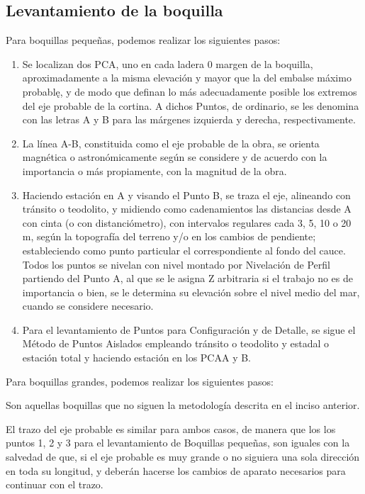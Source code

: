 \subsection{Levantamiento de la boquilla}

Para boquillas pequeñas, podemos realizar los siguientes pasos:

\begin{enumerate}
    \item Se localizan dos PCA, uno en cada ladera 0 margen de la boquilla, aproximadamente a la misma elevación y mayor que la del embalse máximo probablę, y de modo que definan lo más adecuadamente posible los extremos del eje probable de la cortina. A dichos Puntos, de ordinario, se les denomina con las letras A y B para las márgenes izquierda y derecha, respectivamente.
    \item La línea A-B, constituida como el eje probable de la obra, se orienta magnética o astronómicamente según se considere y de acuerdo con la importancia o más propiamente, con la magnitud de la obra.
    \item Haciendo estación en A y visando el Punto B, se traza el eje, alineando con tránsito o teodolito, y midiendo como cadenamientos las distancias desde A con cinta (o con distanciómetro), con intervalos regulares cada 3, 5, 10 o 20 m, según la topografía del terreno y/o en los cambios de pendiente; estableciendo como punto particular el correspondiente al fondo del cauce. Todos los puntos se nivelan con nivel montado por Nivelación de Perfil partiendo del Punto A, al que se le asigna Z arbitraria si el trabajo no es de importancia o bien, se le determina su elevación sobre el nivel medio del mar, cuando se considere necesario.
    \item Para el levantamiento de Puntos para Configuración y de Detalle, se sigue el Método de Puntos Aislados empleando tránsito o teodolito y estadal o estación total y haciendo estación en los PCAA y B.
\end{enumerate}

Para boquillas grandes, podemos realizar los siguientes pasos:

Son aquellas boquillas que no siguen la metodología descrita en el inciso anterior.

El trazo del eje probable es similar para ambos casos, de manera que los los puntos 1, 2 y 3 para el levantamiento de Boquillas pequeñas, son iguales con la salvedad de que, si el eje probable es muy grande o no siguiera una sola dirección en toda su longitud, y deberán hacerse los cambios de aparato necesarios para continuar con el trazo.

